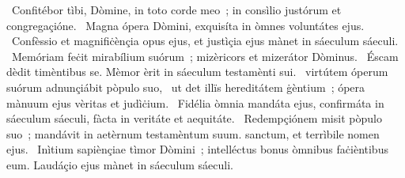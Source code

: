 \psalmChapterWithInscription{}
{ }
{%
~Confitébor tìbi, Dòmine, in toto corde meo~; in consìlio justórum et congregaçióne. 
~Magna ópera Dòmini, exquisíta in òmnes voluntátes ejus. 
~Confèssio et magnifiċènçia opus ejus, et justìçia ejus mànet in sáeculum sáeculi. 
~Memóriam feċit mirabílium suórum~; mizèricors et mizerátor Dòminus. 
~Éscam dèdit timèntibus se. Mèmor èrit in sáeculum testamènti sui. 
~virtútem óperum suórum adnunçiábit pòpulo suo, 
~ut det illïs hereditátem ġèntium~; ópera mànuum ejus vèritas et judìċium. 
~Fidélia òmnia mandáta ejus, confirmáta in sáeculum sáeculi, fàcta in veritáte et aequitáte. 
~Redempçiónem misit pòpulo suo~; mandávit in aetèrnum testamèntum suum. sanctum, et terrìbile nomen ejus. 
~Inìtium sapiènçiae tìmor Dòmini~; intelléctus bonus òmnibus faċièntibus eum. Laudáçio ejus mànet in sáeculum sáeculi. 
}
